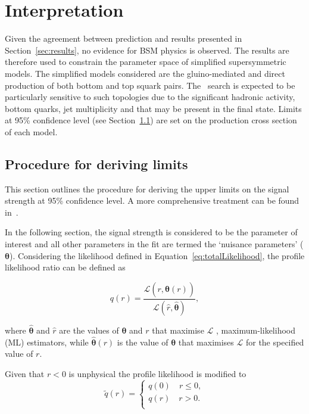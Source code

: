 \clearpage
\section{Interpretation}

Given the agreement between prediction and results presented in Section~\ref{sec:results}, no evidence
for BSM physics is observed. The results are therefore used to constrain
the parameter space of simplified supersymmetric models. The simplified 
models considered are the gluino-mediated and direct production of
both bottom and top squark pairs. The \alphat~search is expected to be particularly
sensitive to such topologies due to the significant hadronic activity, bottom quarks, jet multiplicity
and \mht that may be present in the final state. Limits at 95\% confidence level (see Section~\ref{sec:limits}) 
are set on the production cross section of each model.

\subsection{Procedure for deriving limits}
\label{sec:limits}

This section outlines the procedure for deriving the upper limits on the signal 
strength at 95\% confidence level. A more comprehensive treatment can be found in~\cite{asymp}.

In the following section, the signal strength is considered to be the parameter of interest
and all other parameters in the fit are termed the `nuisance parameters' ($\boldsymbol{\theta}$). Considering
the likelihood defined in Equation~\ref{eq:totalLikelihood}, the profile likelihood ratio can be defined as

\begin{equation}
\label{eq:profile}
q(r) = \frac{\mathcal{L}(r,\hat{\boldsymbol{\theta}}(r))}{\mathcal{L}(\hat{r},\hat{\boldsymbol{\theta}})},
\end{equation}

where $\hat{\boldsymbol{\theta}}$ and $\hat{r}$ are the values of $\boldsymbol{\theta}$ and $r$ that maximise $\mathcal{L}$
, maximum-likelihood (ML) estimators, while $\hat{\boldsymbol{\theta}}(r)$ is the value
of $\boldsymbol{\theta}$ that maximises $\mathcal{L}$ for the specified value of $r$. 

Given that $r < 0$ is unphysical the profile likelihood is modified to
\begin{equation}
\label{eq:profileNew}
\tilde{q}(r) = 
\begin{cases}
q(0)\quad r \le 0, \\ 
q(r)\quad r > 0. \\ 
\end{cases}
\end{equation}

